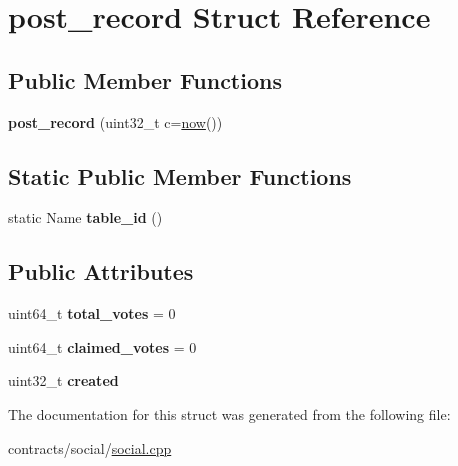 \hypertarget{structpost__record}{}\section{post\+\_\+record Struct Reference}
\label{structpost__record}
\subsection*{Public Member Functions}
\begin{DoxyCompactItemize}
\item 
\mbox{\label{structpost__record_ae01d1c2fc4ec9db327590bcffd8f2a53}} 
{\bfseries post\+\_\+record} (uint32\+\_\+t c=\mbox{\hyperlink{group__systemcapi_ga5eef43c9589d6ef54a0ece1dda5e0ffe}{now}}())
\end{DoxyCompactItemize}
\subsection*{Static Public Member Functions}
\begin{DoxyCompactItemize}
\item 
\mbox{\label{structpost__record_a2be375e278390555c8539da9117fe852}} 
static Name {\bfseries table\+\_\+id} ()
\end{DoxyCompactItemize}
\subsection*{Public Attributes}
\begin{DoxyCompactItemize}
\item 
\mbox{\label{structpost__record_a580585c2172c68521e806129bef13814}} 
uint64\+\_\+t {\bfseries total\+\_\+votes} = 0
\item 
\mbox{\label{structpost__record_ae3335d94db052f10b0295a4c7edffcca}} 
uint64\+\_\+t {\bfseries claimed\+\_\+votes} = 0
\item 
\mbox{\label{structpost__record_add3cd0841f243926d0a8d29bd69c5cdc}} 
uint32\+\_\+t {\bfseries created}
\end{DoxyCompactItemize}


The documentation for this struct was generated from the following file\+:\begin{DoxyCompactItemize}
\item 
contracts/social/\mbox{\hyperlink{social_8cpp}{social.\+cpp}}\end{DoxyCompactItemize}
